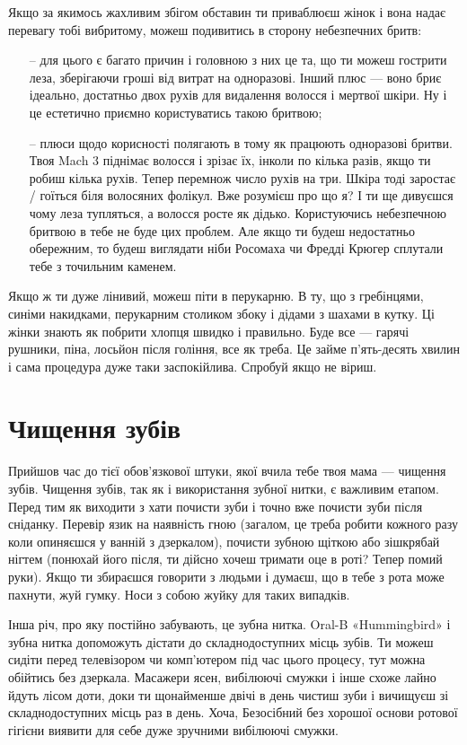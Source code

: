 Якщо за якимось жахливим збігом обставин ти приваблюєш жінок і вона надає
перевагу тобі вибритому, можеш подивитись в сторону небезпечних бритв:
\begin{itemize}
	\item[--] для цього є багато причин і головною з них це та, що ти можеш
	гострити леза, зберігаючи гроші від витрат на одноразові. Інший плюс —
	воно бриє ідеально, достатньо двох рухів для видалення волосся і мертвої
	шкіри. Ну і це естетично приємно користуватись такою бритвою;
	\item[--] плюси щодо корисності полягають в тому як працюють одноразові
	бритви. Твоя Mach 3 піднімає волосся і зрізає їх, інколи по кілька разів,
	якщо ти робиш кілька рухів. Тепер перемнож число рухів на три. Шкіра тоді
	заростає / гоїться біля волосяних фолікул. Вже розумієш про що я? І ти ще
	дивуєшся чому леза тупляться, а волосся росте як дідько. Користуючись
	небезпечною бритвою в тебе не буде цих проблем. Але якщо ти будеш
	недостатньо обережним, то будеш виглядати ніби Росомаха чи Фредді Крюгер
	сплутали тебе з точильним каменем.
\end{itemize}

Якщо ж ти дуже лінивий, можеш піти в перукарню. В ту, що з гребінцями, синіми
накидками, перукарним столиком збоку і дідами з шахами в кутку. Ці жінки знають
як побрити хлопця швидко і правильно. Буде все — гарячі рушники, піна, лосьйон
після гоління, все як треба. Це займе п’ять-десять хвилин і сама процедура
дуже таки заспокійлива. Спробуй якщо не віриш.

\section{Чищення зубів}
Прийшов час до тієї обов’язкової штуки, якої вчила тебе твоя мама — чищення
зубів. Чищення зубів, так як і використання зубної нитки, є важливим етапом.
Перед тим як виходити з хати почисти зуби і точно вже почисти зуби після
сніданку. Перевір язик на наявність гною (загалом, це треба робити кожного
разу коли опиняєшся у ванній з дзеркалом), почисти зубною щіткою або зішкрябай
нігтем (понюхай його після, ти дійсно хочеш тримати оце в роті? Тепер помий
руки). Якщо ти збираєшся говорити з людьми і думаєш, що в тебе з рота може
пахнути, жуй гумку. Носи з собою жуйку для таких випадків.

Інша річ, про яку постійно забувають, це зубна нитка. Oral-B «Hummingbird» і
зубна нитка допоможуть дістати до складнодоступних місць зубів. Ти можеш сидіти
перед телевізором чи комп’ютером під час цього процесу, тут можна обійтись
без дзеркала. Масажери ясен, вибілюючі смужки і інше схоже лайно йдуть лісом
доти, доки ти щонайменше двічі в день чистиш зуби і вичищуєш зі
складнодоступних місць раз в день. Хоча, Безосібний без хорошої основи
ротової гігієни виявити для себе дуже зручними вибілюючі смужки.


